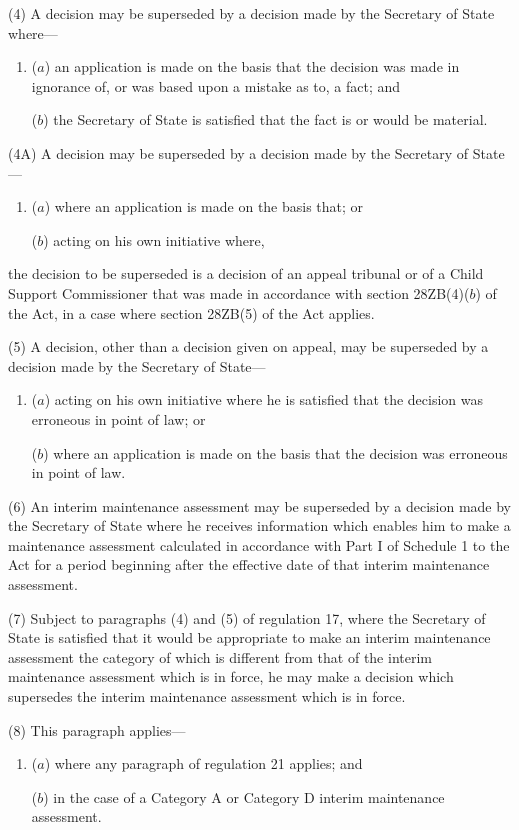 \documentclass[a4paper,12pt]{article}
\begin{document}
(4) A decision may be superseded by a decision made by the Secretary of State where---
\begin{enumerate}\item[]
($a$) an application is made on the basis that the decision was made in ignorance of, or was based upon a mistake as to, a fact; and

($b$) the Secretary of State is satisfied that the fact is or would be material.
\end{enumerate}

(4A) A decision may be superseded by a decision made by the Secretary of State—
\begin{enumerate}\item[]
($a$) where an application is made on the basis that; or

($b$) acting on his own initiative where,
\end{enumerate}
the decision to be superseded is a decision of an appeal tribunal or of a Child Support Commissioner that was made in accordance with section 28ZB(4)($b$)  of the Act, in a case where section 28ZB(5) of the Act applies.

(5) A decision, other than a decision given on appeal, may be superseded by a decision made by the Secretary of State---
\begin{enumerate}\item[]
($a$) acting on his own initiative where he is satisfied that the decision was erroneous in point of law; or

($b$) where an application is made on the basis that the decision was erroneous in point of law.
\end{enumerate}

(6) An interim maintenance assessment may be superseded by a decision made by the Secretary of State where he receives information which enables him to make a maintenance assessment calculated in accordance with Part I of Schedule 1 to the Act for a period beginning after the effective date of that interim maintenance assessment.

(7) Subject to paragraphs (4) and (5) of regulation 17, where the Secretary of State is satisfied that it would be appropriate to make an interim maintenance assessment the category of which is different from that of the interim maintenance assessment which is in force, he may make a decision which supersedes the interim maintenance assessment which is in force.

(8) This paragraph applies---
\begin{enumerate}\item[]
($a$) where any paragraph of regulation 21 applies; and

($b$) in the case of a Category A or Category D interim maintenance assessment.
\end{enumerate}
\end{document}
